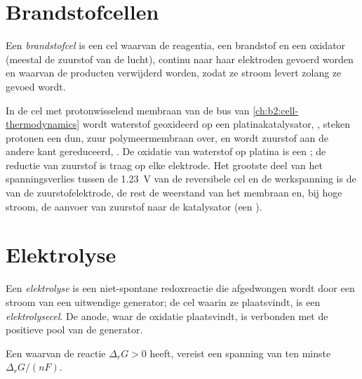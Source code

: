 \section{Brandstofcellen}

\begin{definition}[Brandstofcel]\label{def:b2:batteries-electrolysis:fuel-cell}
Een \emph{brandstofcel} is een cel waarvan de reagentia, een brandstof en een
oxidator (meestal de zuurstof van de lucht), continu naar haar elektroden
gevoerd worden en waarvan de producten verwijderd worden, zodat ze stroom levert zolang
ze gevoed wordt.
\end{definition}

In de cel met protonwisselend membraan van de bus van
\cref{ch:b2:cell-thermodynamics} wordt waterstof geoxideerd op een platinakatalysator,
, steken protonen een dun, zuur polymeermembraan over, en wordt zuurstof
aan de andere kant gereduceerd, . De oxidatie van waterstof
op platina is een ; de reductie van zuurstof is traag op elke
elektrode. Het grootste deel van het spanningsverlies tussen de \qty{1.23}{V} van de reversibele
cel en de werkspanning is de  van de zuurstofelektrode,
de rest de weerstand van het membraan en, bij hoge stroom, de aanvoer van
zuurstof naar de katalysator (een ).

\section{Elektrolyse}

\begin{definition}[Elektrolyse]\label{def:b2:batteries-electrolysis:electrolysis}
Een \emph{elektrolyse} is een niet-spontane redoxreactie
die afgedwongen wordt door een stroom van een uitwendige generator; de cel waarin ze
plaatsvindt, is een \emph{elektrolysecel}. De anode, waar de
oxidatie plaatsvindt, is verbonden met de positieve pool van de generator.
\end{definition}

\begin{proposition}\label{prop:b2:batteries-electrolysis:minimum-voltage}
Een  waarvan de reactie $\Delta_r G > 0$ heeft, vereist een spanning van ten
minste $\Delta_r G/(nF)$.
\end{proposition}

